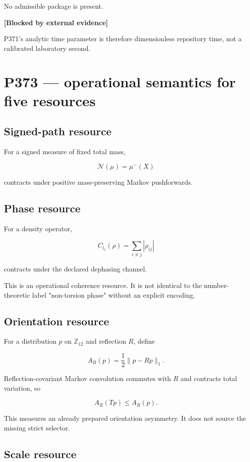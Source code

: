 \documentclass[11pt,a4paper,openany]{report}
\begin{document}
No admissible package is present.

\textbf{[Blocked by external evidence]}

P371's analytic time parameter is therefore dimensionless repository time, not a calibrated laboratory second.

\chapter{P373 --- operational semantics for five resources}

\section{Signed-path resource}

For a signed measure of fixed total mass,

\[
\mathcal N(\mu)=\mu^-(X)
\]

contracts under positive mass-preserving Markov pushforwards.

\section{Phase resource}

For a density operator,

\[
C_{l_1}(\rho)=
\sum_{i\ne j}|\rho_{ij}|
\]

contracts under the declared dephasing channel.

This is an operational coherence resource. It is not identical to the number-theoretic label "non-torsion phase" without an explicit encoding.

\section{Orientation resource}

For a distribution \(p\) on \(\mathbb Z_{12}\) and reflection \(R\), define

\[
A_R(p)=\frac12\|p-Rp\|_1.
\]

Reflection-covariant Markov convolution commutes with \(R\) and contracts total variation, so

\[
A_R(Tp)\leq A_R(p).
\]

This measures an already prepared orientation asymmetry. It does not source the missing strict selector.

\section{Scale resource}
\end{document}
